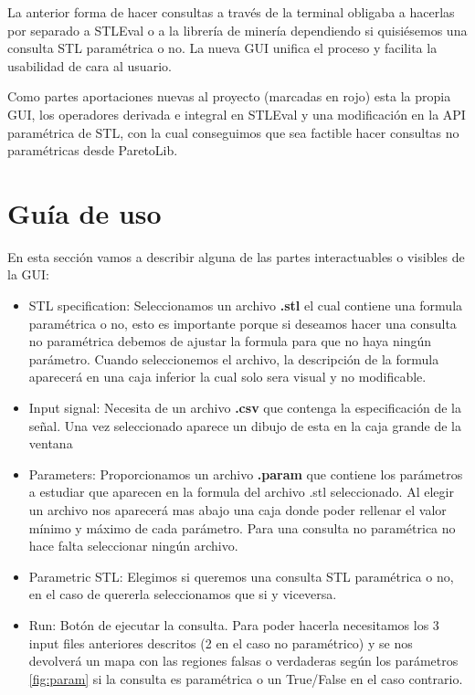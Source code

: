 La anterior forma de hacer consultas a través de la terminal obligaba a hacerlas por separado a STLEval o a la librería de minería dependiendo si quisiésemos una consulta STL paramétrica o no. La nueva GUI unifica el proceso y facilita la usabilidad de cara al usuario.

Como partes aportaciones nuevas al proyecto (marcadas en rojo) esta la propia GUI, los operadores derivada e integral en STLEval y una modificación en la API paramétrica de STL, con la cual conseguimos que sea factible hacer consultas no paramétricas desde ParetoLib.

\section{Guía de uso}
En esta sección vamos a describir alguna de las partes interactuables o visibles de la GUI:

\begin{itemize}
\item STL specification: Seleccionamos un archivo \textbf{.stl} el cual contiene una formula paramétrica o no, esto es importante porque si deseamos hacer una consulta no paramétrica debemos de ajustar la formula para que no haya ningún parámetro. Cuando seleccionemos el archivo, la descripción de la formula aparecerá en una caja inferior la cual solo sera visual y no modificable.

\item Input signal: Necesita de un archivo \textbf{.csv} que contenga la especificación de la señal. Una vez seleccionado aparece un dibujo de esta en la caja grande de la ventana

\item Parameters: Proporcionamos un archivo \textbf{.param} que contiene los parámetros a estudiar que aparecen en la formula del archivo .stl seleccionado. Al elegir un archivo nos aparecerá mas abajo una caja donde poder rellenar el valor mínimo y máximo de cada parámetro. Para una consulta no paramétrica no hace falta seleccionar ningún archivo.

\item Parametric STL: Elegimos si queremos una consulta STL paramétrica o no, en el caso de quererla seleccionamos que si y viceversa.

\item Run: Botón de ejecutar la consulta. Para poder hacerla necesitamos los 3 input files anteriores descritos (2 en el caso no paramétrico) y se nos devolverá un mapa con las regiones falsas o verdaderas según los parámetros \ref{fig:param} si la consulta es paramétrica o un True/False en el caso contrario. 
\end{itemize}

